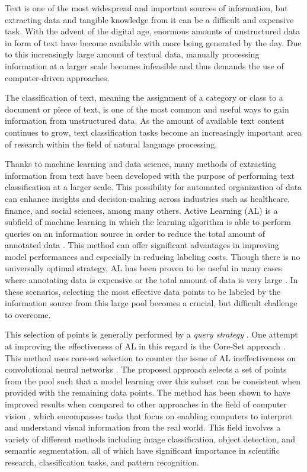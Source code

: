 \documentclass[english,bachelor,ul]{webisthesis} %
\begin{document}
Text is one of the most widespread and important sources of information, but extracting data and tangible knowledge from it can be a difficult and expensive task. With the advent of the digital age, enormous amounts of unstructured data in form of text have become available with more being generated by the day. Due to this increasingly large amount of textual data, manually processing information at a larger scale becomes infeasible and thus demands the use of computer-driven approaches. 

The classification of text, meaning the assignment of a category or class to a document or piece of text, is one of the most common and useful ways to gain information from unstructured data. As the amount of available text content continues to grow, text classification tasks become an increasingly important area of research within the field of natural language processing. 

Thanks to machine learning and data science, many methods of extracting information from text have been developed with the purpose of performing text classification at a larger scale. This possibility for automated organization of data can enhance insights and decision-making across industries such as healthcare, finance, and social sciences, among many others. Active Learning (AL) is a subfield of machine learning in which the learning algorithm is able to perform queries on an information source in order to reduce the total amount of annotated data \citep{settles.tr09}. This method can offer significant advantages in improving model performances and especially in reducing labeling costs. Though there is no universally optimal strategy, AL has been proven to be useful in many cases where annotating data is expensive or the total amount of data is very large \citep{settles.tr09}. In these scenarios, selecting the most effective data points to be labeled by the information source from this large pool becomes a crucial, but difficult challenge to overcome. 

This selection of points is generally performed by a \textit{query strategy} \citep{settles.tr09}. One attempt at improving the effectiveness of AL in this regard is the Core-Set approach \citep{DBLP:conf/iclr/SenerS18}. This method uses core-set selection to counter the issue of AL ineffectiveness on convolutional neural networks \citep{DBLP:conf/iclr/SenerS18}. The proposed approach selects a set of points from the pool such that a model learning over this subset can be consistent when provided with the remaining data points. The method has been shown to have improved results when compared to other approaches in the field of computer vision \citep{DBLP:conf/iclr/SenerS18, DBLP:conf/cvpr/CaramalauBK21}, which encompasses tasks that focus on enabling computers to interpret and understand visual information from the real world. This field involves a variety of different methods including image classification, object detection, and semantic segmentation, all of which have significant importance in scientific research, classification tasks, and pattern recognition.
\end{document}
